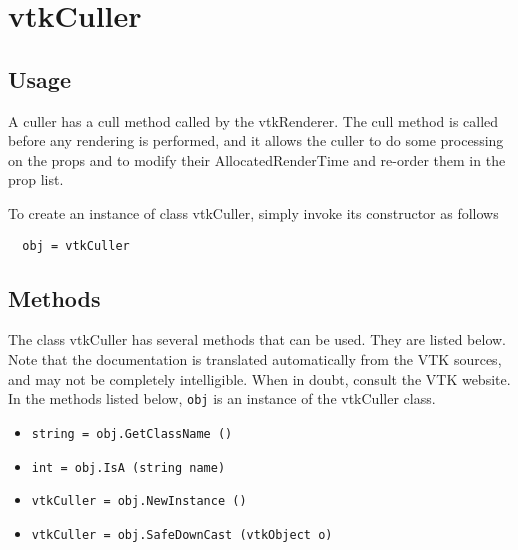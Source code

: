 \section{vtkCuller}

\subsection{Usage}

 A culler has a cull method called by the vtkRenderer. The cull 
 method is called before any rendering is performed,
 and it allows the culler to do some processing on the props and 
 to modify their AllocatedRenderTime and re-order them in the prop list. 

To create an instance of class vtkCuller, simply
invoke its constructor as follows
\begin{verbatim}
  obj = vtkCuller
\end{verbatim}
\subsection{Methods}

The class vtkCuller has several methods that can be used.
  They are listed below.
Note that the documentation is translated automatically from the VTK sources,
and may not be completely intelligible.  When in doubt, consult the VTK website.
In the methods listed below, \verb|obj| is an instance of the vtkCuller class.
\begin{itemize}
\item  \verb|string = obj.GetClassName ()|

\item  \verb|int = obj.IsA (string name)|

\item  \verb|vtkCuller = obj.NewInstance ()|

\item  \verb|vtkCuller = obj.SafeDownCast (vtkObject o)|

\end{itemize}
